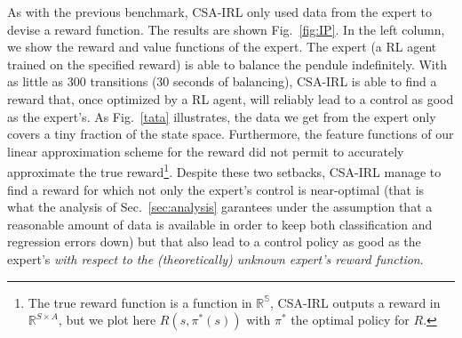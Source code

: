 \documentclass[smallextended]{svjour3}
\begin{document}
As with the previous benchmark, CSA-IRL only used data from the expert to devise a reward function.  The results are shown Fig.~\ref{fig:IP}. In the left column, we show the reward and value functions of the expert. The expert (a RL agent trained on the specified reward) is able to balance the pendule indefinitely. With as little as 300 transitions (30 seconds of balancing), CSA-IRL is able to find a reward that, once optimized by a RL agent, will reliably lead to a control as good as the expert's. As Fig.~\ref{tata} illustrates, the data we get from the expert only covers a tiny fraction of the state space. Furthermore, the feature functions of our linear approximation scheme for the reward did not permit to accurately approximate the true reward\footnote{The true reward function is a function in $\mathbb{R^S}$, CSA-IRL outputs a reward in $\mathbb{R}^{S\times A}$, but we plot here $R(s,\pi^*(s))$ with $\pi^*$ the optimal policy for $R$.}. Despite these two setbacks, CSA-IRL manage to find a reward for which not only the expert's control is near-optimal (that is what the analysis of Sec.~\ref{sec:analysis} garantees under the assumption that a reasonable amount of data is available in order to keep both classification and regression errors down) but that also lead to a control policy as good as the expert's \emph{with respect to the (theoretically) unknown expert's reward function}.
\end{document}
